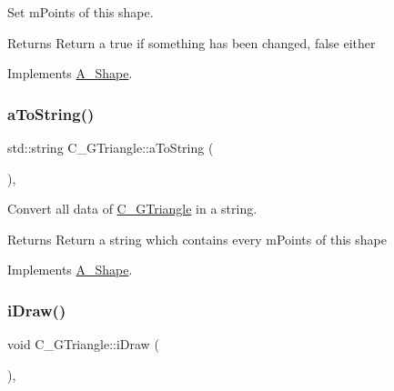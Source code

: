 Set m\+Points of this shape. 

\begin{DoxyReturn}{Returns}
Return a true if something has been changed, false either 
\end{DoxyReturn}


Implements \hyperlink{classA__Shape_a6996f454b337f8425ad13cba3f7a7c35}{A\+\_\+\+Shape}.

\mbox{\label{classC__GTriangle_aa432e8b8320db8a53ef1d59b486ed7ce}} 
\subsubsection{\texorpdfstring{a\+To\+String()}{aToString()}}
{\footnotesize\ttfamily std\+::string C\+\_\+\+G\+Triangle\+::a\+To\+String (\begin{DoxyParamCaption}{ }\end{DoxyParamCaption})\hspace{0.3cm}{\ttfamily [override]}, {\ttfamily [virtual]}}



Convert all data of \hyperlink{classC__GTriangle}{C\+\_\+\+G\+Triangle} in a string. 

\begin{DoxyReturn}{Returns}
Return a string which contains every m\+Points of this shape 
\end{DoxyReturn}


Implements \hyperlink{classA__Shape_ad8804b4e74543db374af6892367b7c2e}{A\+\_\+\+Shape}.

\mbox{\label{classC__GTriangle_a53abbd8cd622323fc2f3b80ce91cfde9}} 
\subsubsection{\texorpdfstring{i\+Draw()}{iDraw()}\hspace{0.1cm}{\footnotesize\ttfamily [1/2]}}
{\footnotesize\ttfamily void C\+\_\+\+G\+Triangle\+::i\+Draw (\begin{DoxyParamCaption}{ }\end{DoxyParamCaption})\hspace{0.3cm}{\ttfamily [override]}, {\ttfamily [virtual]}}



